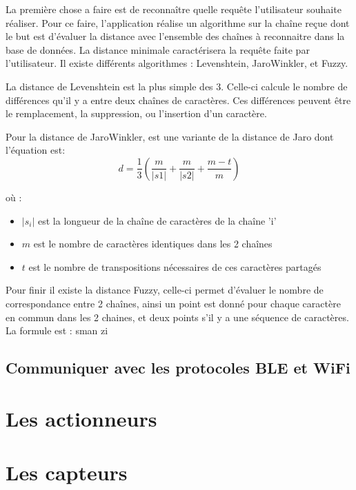 La première chose a faire est de reconnaître quelle requête l'utilisateur souhaite réaliser. Pour ce faire, l'application réalise un algorithme sur la chaîne reçue dont le but est d'évaluer la distance avec l'ensemble des chaînes à reconnaitre dans la base de données. La distance minimale caractérisera la requête faite par l'utilisateur. Il existe différents algorithmes : Levenshtein, JaroWinkler, et Fuzzy. 

La distance de Levenshtein est la plus simple des 3. Celle-ci calcule le nombre de différences qu'il y a entre deux chaînes de caractères. Ces différences peuvent être le remplacement, la suppression, ou l'insertion d'un caractère.

Pour la distance de JaroWinkler, est une variante de la distance de Jaro dont l'équation est:
\begin{equation}
 d = \frac{1}{3}(\frac{m}{|s1|}+\frac{m}{|s2|}+\frac{m-t}{m})
\end{equation}

où :
\begin{itemize}
 \item $|s_i|$ est la longueur de la chaîne de caractères de la chaîne 'i'
 \item $m$ est le nombre de caractères identiques dans les 2 chaînes
 \item $t$ est le nombre de transpositions nécessaires de ces caractères partagés
\end{itemize}

Pour finir il existe la distance Fuzzy, celle-ci permet d'évaluer le nombre de correspondance entre 2 chaînes, ainsi un point est donné pour chaque caractère en commun dans les 2 chaines, et deux points s'il y a une séquence de caractères. La formule est : 
sman zi


	\subsection{Communiquer avec les protocoles BLE et WiFi}
\section{Les actionneurs}
\section{Les capteurs}


